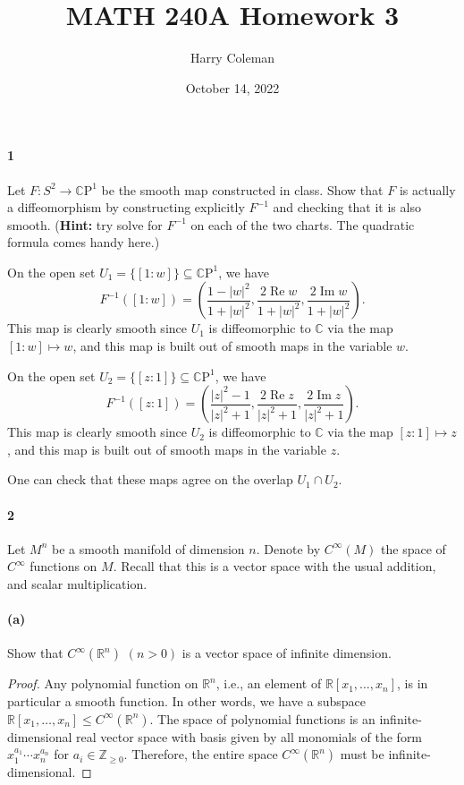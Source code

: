 \documentclass[12pt]{article}
\renewcommand{\maketitle}{\thispagestyle{title}}
\newlength{\myparskip}
\newenvironment{fullbox}{\begin{lrbox}{\savefullbox}\begin{minipage}{\dimexpr\textwidth-2\fboxsep\relax}\setlength{\parskip}{\myparskip}}{\end{minipage}\end{lrbox}\framebox[\textwidth]{\usebox{\savefullbox}}}
\newenvironment{pbox}[1][]{\begin{fullbox}\def\temp{#1}\ifx\temp\empty\else\paragraph{#1}\phantom{}\fi}{\end{fullbox}}
\theoremstyle{definition}
\newcommand{\Z}{\mathbb{Z}}
\newcommand{\R}{\mathbb{R}}
\newcommand{\C}{\mathbb{C}}
\newcommand{\<}{\langle}
\renewcommand{\>}{\rangle}
\newcommand{\seq}{\subseteq}
\newcommand{\CP}{\C\mathrm{P}}
\renewcommand{\Re}{\operatorname{Re}}
\renewcommand{\Im}{\operatorname{Im}}
\begin{document}
\title{MATH 240A Homework 3}
\author{Harry Coleman}
\date{October 14, 2022}
\maketitle



\begin{pbox}[1]
    Let $F: S^2 \to \CP^1$ be the smooth map constructed in class.
    Show that $F$ is actually a diffeomorphism by constructing explicitly $F^{-1}$ and checking that it is also smooth.
    (\textbf{Hint:} try solve for $F^{-1}$ on each of the two charts. The quadratic formula comes handy here.)
\end{pbox}

On the open set $U_1 = \{[1 : w]\} \seq \CP^1$, we have
\[
    F^{-1}([1 : w]) = \left(\frac{1 - |w|^2}{1 + |w|^2}, \frac{2\Re w}{1 + |w|^2}, \frac{2\Im w}{1 + |w|^2}\right).
\]
This map is clearly smooth since $U_1$ is diffeomorphic to $\C$ via the map $[1 : w] \mapsto w$, and this map is built out of smooth maps in the variable $w$.

On the open set $U_2 = \{[z : 1]\} \seq \CP^1$, we have
\[
    F^{-1}([z : 1]) = \left(\frac{|z|^2 - 1}{|z|^2 + 1}, \frac{2\Re z}{|z|^2 + 1}, \frac{2\Im z}{|z|^2 + 1}\right).
\]
This map is clearly smooth since $U_2$ is diffeomorphic to $\C$ via the map $[z : 1] \mapsto z$, and this map is built out of smooth maps in the variable $z$.

One can check that these maps agree on the overlap $U_1 \cap U_2$.



\newpage
\begin{pbox}[2]
    Let $M^n$ be a smooth manifold of dimension $n$. Denote by $C^\infty(M)$ the space of $C^\infty$ functions on $M$.
    Recall that this is a vector space with the usual addition, and scalar multiplication.
\end{pbox}

\begin{pbox}[(a)]
    Show that $C^\infty(\R^n)$ $(n>0)$ is a vector space of infinite dimension.
\end{pbox}

\begin{proof}
    Any polynomial function on $\R^n$, i.e., an element of $\R[x_1, \dots, x_n]$, is in particular a smooth function.
    In other words, we have a subspace $\R[x_1, \dots, x_n] \leq C^\infty(\R^n)$.
    The space of polynomial functions is an infinite-dimensional real vector space with basis given by all monomials of the form $x_1^{a_1} \cdots x_n^{a_n}$ for $a_i \in \Z_{\geq0}$.
    Therefore, the entire space $C^\infty(\R^n)$ must be infinite-dimensional.
\end{proof}
\end{document}
